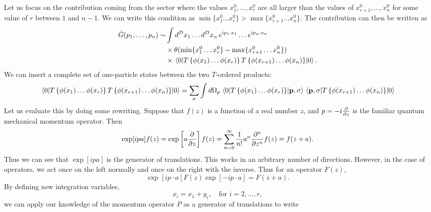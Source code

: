 \documentclass{article}
\numberwithin{equation}{section}
\begin{document}
Let us focus on the contribution coming from the sector where the values $x_1^0, \dots, x_r^0$ are all larger than the values of $x_{r+1}^0, \dots , x_n^0$ for some value of $r$ between $1$ and $n-1$. We can write this condition as $\min\{x_1^0 \dots x_r^0\} > \max\{x_{r+1}^0 \dots x_n^0\}$. The contribution can then be written as 
\begin{equation}
\begin{aligned}
    \tilde{G}(p_1, \dots, p_n) \sim &\int d^Dx_1 \dots d^Dx_n \, e^{ip_1\cdot x_1} \dots e^{ip_n \cdot x_n} \\
    &\times \theta(\min\{x_1^0 \dots x_r^0\} - \max\{x_{r+1}^0 \dots x_n^0\}) \\
    &\times \ev{T\left\{\phi(x_1) \dots \phi(x_r)\right\} T \left\{\phi(x_{r+1}) \dots \phi(x_n)\right\}}{0}.
\end{aligned}
\end{equation}
We can insert a complete set of one-particle states between the two $T$-ordered products:
\begin{equation}
\begin{aligned}
    \ev{T\left\{\phi(x_1) \dots \phi(x_r)\right\} T \left\{\phi(x_{r+1}) \dots \phi(x_n)\right\}}{0} = \sum_\sigma \int d\Omega_p \, \mel{0}{T\left\{\phi(x_1) \dots \phi(x_r)\right\} }{\vb{p}, \sigma} \mel{\vb{p}, \sigma}{T \left\{\phi(x_{r+1}) \dots \phi(x_n)\right\}}{0}
\end{aligned}
\end{equation}
Let us evaluate this by doing some rewriting. Suppose that $f(z)$ is a function of a real number $z$, and $p = -i \pdv{z}$ is the familiar quantum mechanical momentum operator. Then
\begin{equation}
    \exp[ipa] f(z) = \exp\left[a \pdv{z}\right] f(z) = \sum_{n=0}^\infty \frac{1}{n!} a^n \pdv[n]{z} f(z) = f(z+a).
\end{equation}
Thus we can see that $\exp[ipa]$ is the generator of translations. This works in an arbitrary number of directions. However, in the case of operators, we act once on the left normally and once on the right with the inverse. Thus for an operator $F(z)$,
\begin{equation}
    \exp[ip\cdot a] F(z) \exp[-ip\cdot a] = F(z+a).
\end{equation}
By defining new integration variables,
\begin{equation}
    x_i = x_1 + y_i, \quad \text{for } i=2, \dots, r,
\end{equation}
we can apply our knowledge of the momentum operator $P$ as a generator of translations to write
\end{document}
